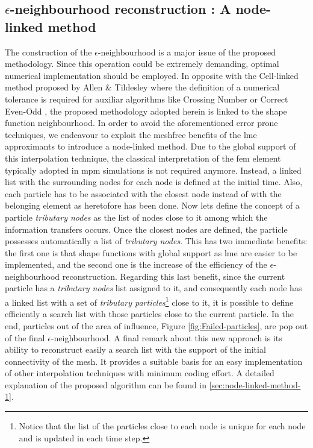 \documentclass[preprint,12pt,a4paper]{elsarticle}
\begin{document}
\subsection{$\epsilon$-neighbourhood reconstruction : A node-linked method}
\label{sec:epsil-neighb-reconst}
The construction of the $\epsilon$-neighbourhood is a major issue of the proposed methodology. Since this operation could be extremely demanding, optimal
numerical implementation should be employed. In opposite with the Cell-linked
method proposed by Allen \& Tildesley \cite{Allen_et_al_1989} where
the definition of a numerical tolerance is required for auxiliar
algorithms like Crossing Number \cite{Shimrat_1962} or Correct
Even-Odd \cite{Galetzka_et_al_2017}, the proposed methodology adopted herein is linked to the shape function neighbourhood. In order to avoid the aforementioned error prone
techniques, we endeavour to exploit the meshfree benefits of
the \acrshort{lme} approximants to introduce a node-linked method. Due
to the global support of this interpolation technique, the classical
interpretation of the \acrshort{fem} element typically adopted in
\acrshort{mpm} simulations is not required anymore. Instead, a linked
list with the surrounding nodes for each node is defined at the initial
time. Also, each particle has to be associated with the
closest node instead of with the belonging element as heretofore has been
done.
Now lets define the concept of a particle \textit{tributary nodes} as the
list of nodes close to it among which the information transfers
occurs. Once the closest nodes are defined, the particle
possesses automatically a list of \textit{tributary nodes}. This has two
immediate benefits: the first one is that shape functions with global
support as \acrshort{lme} are easier to be implemented,
and the second one is the increase of the efficiency of the $\epsilon$-neighbourhood
reconstruction. Regarding this last benefit, since the current
particle has a \textit{tributary nodes} list assigned to it, and
consequently each node has a linked list with a set of
\textit{tributary particles}\footnote{Notice that the list of the
  particles close to each node is unique for each node and is updated
  in each time step.} close to it, it is possible to define efficiently a
search list with those particles close to the current particle.
In the end, particles out of the area of influence, Figure
\ref{fig:Failed-particles}, are pop out of the final
$\epsilon$-neighbourhood. A final remark about this new approach is
its ability to reconstruct easily a search list with the support of
the initial connectivity of the mesh. It provides a suitable basis for
an easy implementation of other interpolation techniques with minimum
coding effort. A detailed explanation of the proposed algorithm can be
found in \ref{sec:node-linked-method-1}.
\end{document}
